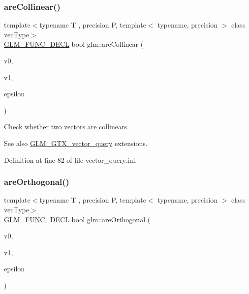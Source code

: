 \subsubsection{\texorpdfstring{areCollinear()}{areCollinear()}}
{\footnotesize\ttfamily template$<$typename T , precision P, template$<$ typename, precision $>$ class vec\+Type$>$ \\
\mbox{\hyperlink{setup_8hpp_ab2d052de21a70539923e9bcbf6e83a51}{G\+L\+M\+\_\+\+F\+U\+N\+C\+\_\+\+D\+E\+CL}} bool glm\+::are\+Collinear (\begin{DoxyParamCaption}\item[{vec\+Type$<$ T, P $>$ const \&}]{v0,  }\item[{vec\+Type$<$ T, P $>$ const \&}]{v1,  }\item[{T const \&}]{epsilon }\end{DoxyParamCaption})}

Check whether two vectors are collinears. \begin{DoxySeeAlso}{See also}
\mbox{\hyperlink{group__gtx__vector__query}{G\+L\+M\+\_\+\+G\+T\+X\+\_\+vector\+\_\+query}} extensions. 
\end{DoxySeeAlso}


Definition at line 82 of file vector\+\_\+query.\+inl.

\mbox{\label{group__gtx__vector__query_gaee10acefed397c11e01f2862e837754c}} 
\subsubsection{\texorpdfstring{areOrthogonal()}{areOrthogonal()}}
{\footnotesize\ttfamily template$<$typename T , precision P, template$<$ typename, precision $>$ class vec\+Type$>$ \\
\mbox{\hyperlink{setup_8hpp_ab2d052de21a70539923e9bcbf6e83a51}{G\+L\+M\+\_\+\+F\+U\+N\+C\+\_\+\+D\+E\+CL}} bool glm\+::are\+Orthogonal (\begin{DoxyParamCaption}\item[{vec\+Type$<$ T, P $>$ const \&}]{v0,  }\item[{vec\+Type$<$ T, P $>$ const \&}]{v1,  }\item[{T const \&}]{epsilon }\end{DoxyParamCaption})}

